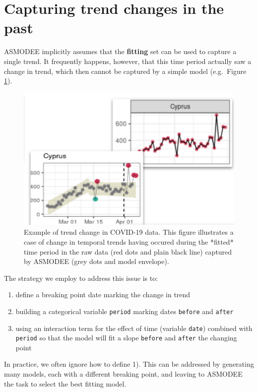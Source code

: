 \documentclass[]{book}
\providecommand{\tightlist}{%
  \setlength{\itemsep}{0pt}\setlength{\parskip}{0pt}}
\begin{document}
\hypertarget{capturing-trend-changes-in-the-past}{%
\section{Capturing trend changes in the past}\label{capturing-trend-changes-in-the-past}}

ASMODEE implicitly assumes that the \textbf{fitting} set can be used to capture a
single trend. It frequently happens, however, that this time period actually saw
a change in trend, which then cannot be captured by a simple model (e.g.~Figure
\ref{fig:asmodee-change}).

\begin{figure}

{\centering \includegraphics[width=0.6\linewidth]{images/asmodee_change} 

}

\caption{Example of trend change in COVID-19 data. This figure illustrates a case of change in temporal trends having occured during the *fitted* time period in the raw data (red dots and plain black line) captured by ASMODEE (grey dots and model envelope).}\label{fig:asmodee-change}
\end{figure}

The strategy we employ to address this issue is to:

\begin{enumerate}
\def\labelenumi{\arabic{enumi}.}
\tightlist
\item
  define a breaking point date marking the change in trend
\item
  building a categorical variable \texttt{period} marking dates \texttt{before} and \texttt{after}
\item
  using an interaction term for the effect of time (variable \texttt{date}) combined
  with \texttt{period} so that the model will fit a slope \texttt{before} and \texttt{after} the
  changing point
\end{enumerate}

In practice, we often ignore how to define 1). This can be addressed by
generating many models, each with a different breaking point, and leaving to
ASMODEE the task to select the best fitting model.
\end{document}
